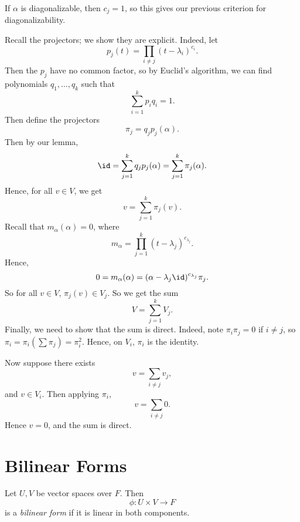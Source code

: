 \documentclass[12pt]{article}
\begin{document}
\begin{remark}
	If $\alpha$ is diagonalizable, then $c_j = 1$, so this gives our previous criterion for diagonalizability.
\end{remark}

\begin{proofbox}
	Recall the projectors; we show they are explicit. Indeed, let
	\[
		p_j(t) = \prod_{i \neq j}(t - \lambda_i)^{c_i}
	.\]
	Then the $p_j$ have no common factor, so by Euclid's algorithm, we can find polynomials $q_1, \ldots, q_k$ such that
	\[
	\sum_{i = 1}^{k} p_i q_i = 1
	.\]
	Then define the projectors
	\[
		\pi_j = q_j p_j (\alpha)
	.\]
	Then by our lemma,
	\[
		\id = \sum_{j = 1}^{k} q_j p_j (\alpha) = \sum_{j = 1}^{k} \pi_j(\alpha)
	.\]
	Hence, for all $v \in V$, we get
	\[
		v = \sum_{j = 1}^{k} \pi_j(v)
	.\]
	Recall that $m_{\alpha}(\alpha) = 0$, where
	\[
		m_{\alpha} = \prod_{j = 1}^{k}(t - \lambda_j)^{c_{\lambda_j}}
	.\]
	Hence,
	\[
		0 = m_{\alpha}(\alpha) = (\alpha - \lambda_j \id)^{c_{\lambda_j}} \pi_j
	.\]
	So for all $v \in V$, $\pi_j(v) \in V_j$. So we get the sum
	\[
	V = \sum_{j = 1}^{k} V_j
	.\]
	Finally, we need to show that the sum is direct. Indeed, note $\pi_i \pi_j = 0$ if $i \neq j$, so $\pi_i= \pi_i ( \sum \pi_j) = \pi_i^2$. Hence, on $V_{i}$, $\pi_i$ is the identity.

	Now suppose there exists
	\[
	v = \sum_{i \neq j} v_j
	,\]
	and $v \in V_i$. Then applying $\pi_i$,
	\[
	v = \sum_{i \neq j} 0
	.\]
	Hence $v = 0$, and the sum is direct.
\end{proofbox}

\newpage

\section{Bilinear Forms}%
\label{sec:bilinear_forms}

\begin{definition}
	Let $U, V$ be vector spaces over $F$. Then
	\[
	\phi : U \times V \to F
	\]
	is a \textit{bilinear form} if it is linear in both components.
\end{definition}
\end{document}
